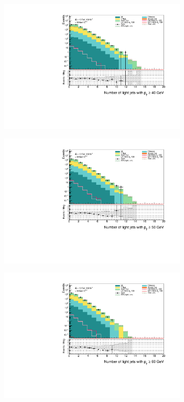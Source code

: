 \documentclass[12pt, a4paper]{book}
\begin{document}
\begin{figure}[!ht]
\begin{subfigure}[b]{0.49\textwidth}
        \centering
        \includegraphics[width=\textwidth]{ljetsPt40.pdf}
    \end{subfigure}
    \hfill\begin{subfigure}[b]{0.49\textwidth}
        \centering
        \includegraphics[width=\textwidth]{ljetsPt50.pdf}
    \end{subfigure}
    \hfill\begin{subfigure}[b]{0.49\textwidth}
        \centering
        \includegraphics[width=\textwidth]{ljetsPt60.pdf}

\end{subfigure}
\end{figure}
\end{document}
